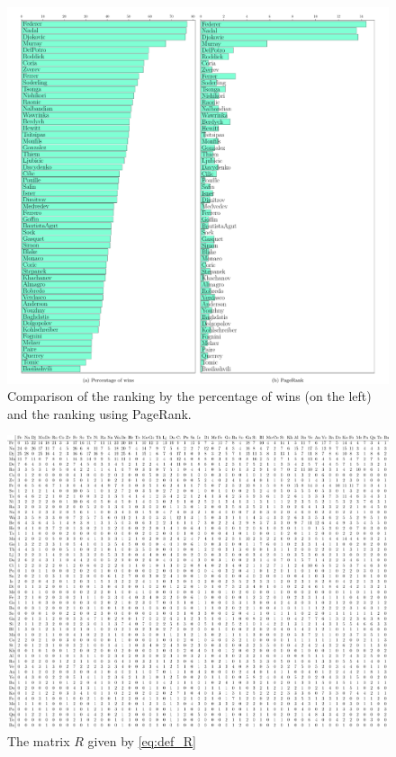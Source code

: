 \documentclass[11pt,nocut]{article}
\begin{document}
\begin{figure}[h!]
    \centering
	\hspace*{-2cm}
	\includegraphics[width=1.23\textwidth]{./pagerank_tennis.pdf}
	\caption{Comparison of the ranking by the percentage of wins (on the left) and the ranking using PageRank.}
	\label{fig:ranking}
\end{figure}
\begin{figure}[h!]
    \centering
	\hspace*{-2cm}
	\includegraphics[width=1.23\textwidth]{./confrontations.pdf}
	\caption{The matrix $R$ given by \eqref{eq:def_R}}
	\label{fig:confrontations}
\end{figure}


\vspace{1cm}
\centerline{}




\end{document}
